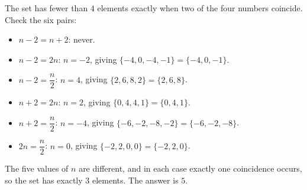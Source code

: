 The set has fewer than $4$ elements exactly when two of the four numbers coincide. Check the six pairs:
\begin{itemize}
\item $n-2=n+2$: never.
\item $n-2=2n$: $n=-2$, giving $\{-4,0,-4,-1\}=\{-4,0,-1\}$.
\item $n-2=\dfrac{n}{2}$: $n=4$, giving $\{2,6,8,2\}=\{2,6,8\}$.
\item $n+2=2n$: $n=2$, giving $\{0,4,4,1\}=\{0,4,1\}$.
\item $n+2=\dfrac{n}{2}$: $n=-4$, giving $\{-6,-2,-8,-2\}=\{-6,-2,-8\}$.
\item $2n=\dfrac{n}{2}$: $n=0$, giving $\{-2,2,0,0\}=\{-2,2,0\}$.
\end{itemize}
The five values of $n$ are different, and in each case exactly one coincidence occurs, so the set has exactly $3$ elements. The answer is $\boxed{5}$.
